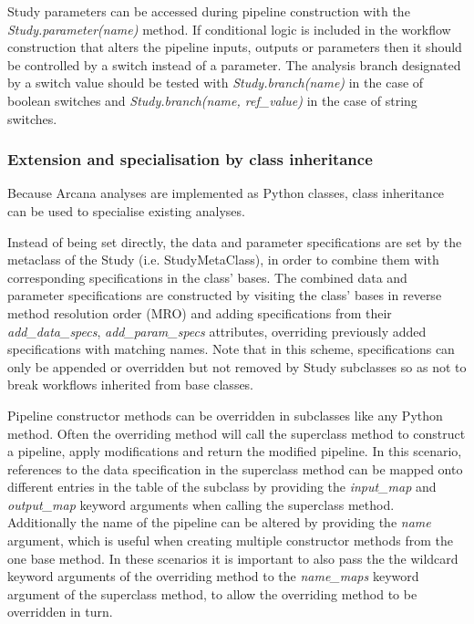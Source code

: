 \documentclass[smallextended]{svjour3}       %
\begin{document}
Study parameters can be accessed during pipeline construction with the
\emph{Study.parameter(name)} method. If conditional logic is included in
the workflow construction that alters the pipeline inputs, outputs or
parameters then it should be controlled by a switch instead of a
parameter. The analysis branch designated by a switch value should be
tested with \emph{Study.branch(name)} in the case of boolean switches and
\emph{Study.branch(name, ref\_value)} in the case of string switches.

\subsubsection*{Extension and specialisation by class inheritance}
\label{extension-and-specialisation-by-class-inheritance}

Because Arcana analyses are implemented as Python classes, class
inheritance can be used to specialise existing analyses.

Instead of being set directly, the data and parameter specifications are set
by the metaclass of the Study (i.e. StudyMetaClass),
in order to combine them with corresponding specifications in the class' bases. The combined
data and parameter specifications are constructed by visiting the class'
bases in reverse method resolution order (MRO) and adding specifications
from their \emph{add\_data\_specs}, \emph{add\_param\_specs} attributes,
overriding previously added specifications with matching names. Note
that in this scheme, specifications can only be appended or overridden
but not removed by Study subclasses so as not to break workflows
inherited from base classes.

Pipeline constructor methods can be overridden in subclasses like any Python
method. Often the overriding method will call the superclass method
to construct a pipeline, apply modifications and return the
modified pipeline. In this scenario, references to the data
specification in the superclass method can be mapped onto different
entries in the table of the subclass by providing the \emph{input\_map} and
\emph{output\_map} keyword arguments when calling the superclass method.
Additionally the name of the pipeline can be altered by providing the \emph{name}
argument, which is useful when creating multiple  constructor methods from the
one base method. In these scenarios it is important to
also pass the the wildcard keyword arguments of the overriding method to the
\emph{name\_maps} keyword argument of the superclass method, to allow the
overriding method to be overridden in turn.
\end{document}
